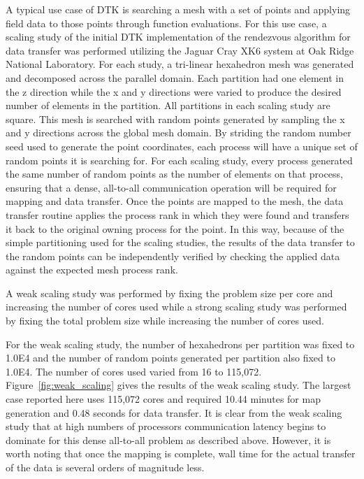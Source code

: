 \documentclass{mc2013}
\begin{document}
A typical use case of DTK is searching a mesh with a set of points and
applying field data to those points through function evaluations. For
this use case, a scaling study of the initial DTK implementation of
the rendezvous algorithm for data transfer was performed utilizing the
Jaguar Cray XK6 system at Oak Ridge National Laboratory. For each
study, a tri-linear hexahedron mesh was generated and decomposed
across the parallel domain. Each partition had one element in the z
direction while the x and y directions were varied to produce the
desired number of elements in the partition. All partitions in each
scaling study are square. This mesh is searched with random points
generated by sampling the x and y directions across the global mesh
domain.  By striding the random number seed used to generate the point
coordinates, each process will have a unique set of random points it
is searching for. For each scaling study, every process generated the
same number of random points as the number of elements on that
process, ensuring that a dense, all-to-all communication operation
will be required for mapping and data transfer. Once the points are
mapped to the mesh, the data transfer routine applies the process rank
in which they were found and transfers it back to the original owning
process for the point. In this way, because of the simple partitioning
used for the scaling studies, the results of the data transfer to the
random points can be independently verified by checking the applied
data against the expected mesh process rank.

A weak scaling study was performed by fixing the problem size per core
and increasing the number of cores used while a strong scaling study
was performed by fixing the total problem size while increasing the
number of cores used.

\label{subsec:weak_scaling}
For the weak scaling study, the number of hexahedrons per partition
was fixed to 1.0E4 and the number of random points generated per
partition also fixed to 1.0E4. The number of cores used varied from 16
to 115,072. Figure~\ref{fig:weak_scaling} gives the results of the
weak scaling study. The largest case reported here uses 115,072 cores
and required 10.44 minutes for map generation and 0.48 seconds for
data transfer. It is clear from the weak scaling study that at high
numbers of processors communication latency begins to dominate for
this dense all-to-all problem as described above. However, it is worth
noting that once the mapping is complete, wall time for the actual
transfer of the data is several orders of magnitude less.
\end{document}
